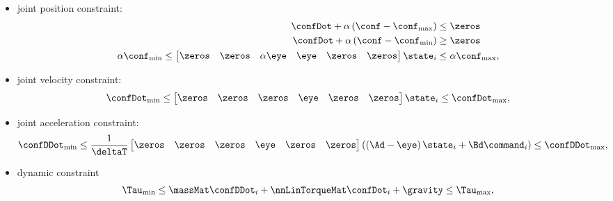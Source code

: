 \begin{itemize}
	\item joint position constraint:
	\begin{align}
		\confDot + \alpha\left(\conf - \conf_{\max}\right) &\leq \zeros \\
		\confDot + \alpha\left(\conf - \conf_{\min}\right) &\geq \zeros  \\
		\label{eq:MPC joint-pos constraint}\alpha\conf_{\min}\leq \begin{bmatrix}
			\zeros & \zeros & \alpha\eye &\eye  &\zeros  &\zeros  
		\end{bmatrix}\state_{i} &\leq \alpha\conf_{\max},
	\end{align}
	\item joint velocity constraint:
	\begin{equation}\label{eq:MPC joint-vel constraint}
		\confDot_{\min}\leq \begin{bmatrix}
			\zeros & \zeros &  \zeros  &\eye &\zeros  &\zeros  
		\end{bmatrix}\state_{i} \leq \confDot_{\max},
	\end{equation}
	\item joint acceleration constraint:
	\begin{equation}\label{eq:MPC joint-acc constraint}
		\confDDot_{\min}\leq \frac{1}{\deltaT}\begin{bmatrix}
			\zeros & \zeros & \zeros & \eye &\zeros  &\zeros  
		\end{bmatrix}\left(\left(\Ad-\eye\right)\state_{i} + \Bd\command_{i}\right) \leq \confDDot_{\max},
	\end{equation}
	\item dynamic constraint 
	\begin{align}\label{eq:MPC dynamic constraint}
		\begin{split}
			\Tau_{\min}&\leq \massMat\confDDot_{i} + \nnLinTorqueMat\confDot_{i} + \gravity \leq \Tau_{\max}, \\ 

\end{split}
\end{align}
\end{itemize}
